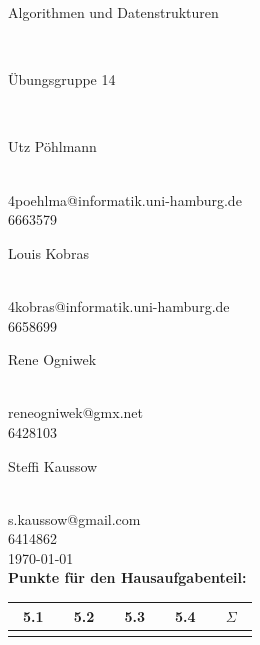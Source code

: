 \documentclass{article}
\begin{document}
\thispagestyle{empty}
\-\vspace{2cm}
\begin{center}
	\begin{Huge}
		Algorithmen und Datenstrukturen
	\end{Huge}\\
	\vspace{2cm}
	\begin{LARGE}
		Übungsgruppe 14
	\end{LARGE}\\
	\vspace{2cm}
	\begin{Large}
		Utz Pöhlmann
	\end{Large}\\
	4poehlma@informatik.uni-hamburg.de\\
	6663579\\
	\vspace{1cm}
	\begin{Large}
		Louis Kobras
	\end{Large}\\
	4kobras@informatik.uni-hamburg.de\\
	6658699\\
	\vspace{1cm}
	\begin{Large}
		Rene Ogniwek
	\end{Large}\\
	reneogniwek@gmx.net\\
	6428103\\
	\vspace{1cm}
	\begin{Large}
		Steffi Kaussow
	\end{Large}\\
	s.kaussow@gmail.com\\
	6414862\\
	\vspace{2cm}
	\today\\
	\vspace{2cm}
	\textbf{Punkte für den Hausaufgabenteil:}\\
	\vspace{1cm}
	\begin{tabular}{c|c|c|c|c}
	~5.1~&~5.2~&~5.3~&~5.4~&~$\Sigma$~	\\	\hline
		 &	   &	 &	   &
	\end{tabular}
\end{center}
\end{document}
